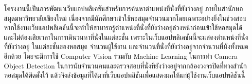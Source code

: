 \maketitle
\makesignature

\ifproject
\begin{abstractTH}
    โครงงานนี้เป็นการพัฒนาเว็บแอปพลิเคชันสำหรับการค้นหาตำแหน่งที่นั่งที่ยังว่างอยู่ 
    \enskip ภายในสำนักหอสมุดมหาวิทยาลัยเชียงใหม่ 
    เนื่องจากมีนักศึกษาเข้าใช้หอสมุดจำนวนมากโดยเฉพาะอย่างยิ่งในช่วงสอบ 
    หากใช้งานเว็บแอปพลิเคชันนี้จะทำให้สามารถรู้ตำแหน่งที่นั่งที่ยังว่างอยู่ล่วงหน้าก่อนเข้าใช้หอสมุดได้ 
    และไม่ต้องเสียเวลาในการเดินวนหาที่นั่งในแต่ละชั้น เพราะในเว็บแอปพลิเคชันนี้จะแสดงตำแหน่งที่นั่งที่ยังว่างอยู่
    \enskip ในแต่ละชั้นของหอสมุด จำนวนผู้ใช้งาน และจำนวนที่นั่งที่ยังว่างอยู่จากจำนวนที่นั่งทั้งหมดอีกด้วย 
    โดยจะมีการใช้ Computer Vision ร่วมกับ Machine Learning ในการทำ Camera Object Detection 
    ในการนับจำนวนคนและตรวจสอบที่นั่งที่ยังว่างอยู่จากกล้องวงจรปิดที่ทางสำนักหอสมุดได้ติดตั้งไว้ 
    แล้วจึงส่งข้อมูลที่ได้มาที่เว็บแอปพลิชันเพื่อแสดงผลให้แก่ผู้ใช้งานเว็บแอปพลิชันนี้    
\end{abstractTH}

\iffalse
\begin{dedication}
This document is dedicated to all Chiang Mai University students.

Dedication page is optional.
\end{dedication}
\fi %

\contentspage

\ifproject
\figurelistpage
\fi %



